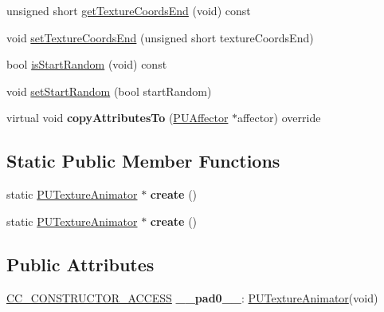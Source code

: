 \begin{DoxyCompactItemize}
\item 
unsigned short \hyperlink{classPUTextureAnimator_ada75476207f3dd94b93c0420b48e5fdc}{get\+Texture\+Coords\+End} (void) const
\item 
void \hyperlink{classPUTextureAnimator_a16426b883a49629f1dd822353a055998}{set\+Texture\+Coords\+End} (unsigned short texture\+Coords\+End)
\item 
bool \hyperlink{classPUTextureAnimator_af735af4741e4df123322d22153d1a95f}{is\+Start\+Random} (void) const
\item 
void \hyperlink{classPUTextureAnimator_a0f7dcc76337aa00523f0fdf4a4992247}{set\+Start\+Random} (bool start\+Random)
\item 
\mbox{\label{classPUTextureAnimator_a9f81ddbf6516d8c71271919c44b06878}} 
virtual void {\bfseries copy\+Attributes\+To} (\hyperlink{classPUAffector}{P\+U\+Affector} $\ast$affector) override
\end{DoxyCompactItemize}
\subsection*{Static Public Member Functions}
\begin{DoxyCompactItemize}
\item 
\mbox{\label{classPUTextureAnimator_a302cf9791038c608b996c4818ad22fce}} 
static \hyperlink{classPUTextureAnimator}{P\+U\+Texture\+Animator} $\ast$ {\bfseries create} ()
\item 
\mbox{\label{classPUTextureAnimator_a5ec1d491e8261e4e234685d85a427025}} 
static \hyperlink{classPUTextureAnimator}{P\+U\+Texture\+Animator} $\ast$ {\bfseries create} ()
\end{DoxyCompactItemize}
\subsection*{Public Attributes}
\begin{DoxyCompactItemize}
\item 
\mbox{\label{classPUTextureAnimator_a171d58f5f63adc9e8c3495b57cc346e2}} 
\hyperlink{_2cocos2d_2cocos_2base_2ccConfig_8h_a25ef1314f97c35a2ed3d029b0ead6da0}{C\+C\+\_\+\+C\+O\+N\+S\+T\+R\+U\+C\+T\+O\+R\+\_\+\+A\+C\+C\+E\+SS} {\bfseries \+\_\+\+\_\+pad0\+\_\+\+\_\+}\+: \hyperlink{classPUTextureAnimator}{P\+U\+Texture\+Animator}(void)
\end{DoxyCompactItemize}
